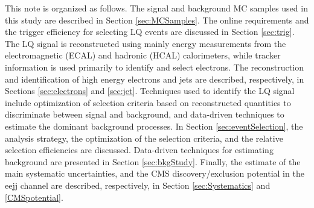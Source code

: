 %
This note is organized as follows. 
The signal and background MC samples used in this study are described in Section \ref{sec:MCSamples}.
The online requirements and the trigger efficiency for selecting LQ events are discussed in Section \ref{sec:trig}.
The LQ signal is reconstructed using mainly energy measurements from the
electromagnetic (ECAL) and hadronic (HCAL) calorimeters, while tracker information 
is used primarily to identify and select electrons. 
The reconstruction and identification of high energy electrons and jets are described, respectively, 
in Sections \ref{sec:electrons} and \ref{sec:jet}.
Techniques used to identify the LQ signal include optimization of selection criteria based on 
reconstructed quantities to discriminate between signal and background, 
and data-driven techniques to estimate the dominant background processes.
In Section \ref{sec:eventSelection}, the analysis strategy, the optimization of the selection criteria, 
and the relative selection efficiencies are discussed. 
Data-driven techniques for estimating background are presented in Section \ref{sec:bkgStudy}.
Finally, the estimate of the main systematic uncertainties, and the CMS discovery/exclusion potential 
in the eejj channel are described, respectively, in Section \ref{sec:Systematics} and \ref{CMSpotential}.




%
